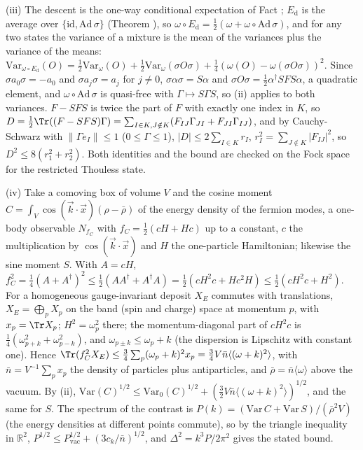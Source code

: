 (iii) The descent is the one-way conditional expectation of Fact ; $E_{\mathrm{d}}$ is the average over $\{\mathrm{id}, \mathrm{Ad}\,\sigma\}$ (Theorem ), so $\omega\circ E_{\mathrm{d}} = \tfrac12(\omega + \omega\circ\mathrm{Ad}\,\sigma)$, and for any two states the variance of a mixture is the mean of the variances plus the variance of the means: $\mathrm{Var}_{\omega\circ E_{\mathrm{d}}}(O) = \tfrac12\mathrm{Var}_{\omega}(O) + \tfrac12\mathrm{Var}_{\omega}(\sigma O\sigma) + \tfrac14(\omega(O) - \omega(\sigma O\sigma))^{2}$. Since $\sigma a_{0}\sigma = -a_{0}$ and $\sigma a_{j}\sigma = a_{j}$ for $j \ne 0$, $\sigma\alpha\sigma = S\alpha$ and $\sigma O\sigma = \tfrac12\alpha^{\dagger}SFS\alpha$, a quadratic element, and $\omega\circ\mathrm{Ad}\,\sigma$ is quasi-free with $\Gamma \mapsto S\Gamma S$, so (ii) applies to both variances. $F - SFS$ is twice the part of $F$ with exactly one index in $K$, so $D = \tfrac12\Tr((F - SFS)\Gamma) = \sum_{I \in K, J \notin K}(F_{IJ}\Gamma_{JI} + F_{JI}\Gamma_{IJ})$, and by Cauchy-Schwarz with $\|\Gamma e_{I}\| \le 1$ ($0 \le \Gamma \le 1$), $|D| \le 2\sum_{I \in K}r_{I}$, $r_{I}^{2} = \sum_{J \notin K}|F_{IJ}|^{2}$, so $D^{2} \le 8(r_{1}^{2} + r_{2}^{2})$. Both identities and the bound are checked on the Fock space for the restricted Thouless state.

(iv) Take a comoving box of volume $V$ and the cosine moment $C = \int_{V}\cos(\vec k\cdot\vec x)(\rho - \bar\rho)$ of the energy density of the fermion modes, a one-body observable $N_{f_{C}}$ with $f_{C} = \tfrac12(cH + Hc)$ up to a constant, $c$ the multiplication by $\cos(\vec k\cdot\vec x)$ and $H$ the one-particle Hamiltonian; likewise the sine moment $S$. With $A = cH$, $f_{C}^{2} = \tfrac14(A + A^{\dagger})^{2} \le \tfrac12(AA^{\dagger} + A^{\dagger}A) = \tfrac12(cH^{2}c + Hc^{2}H) \le \tfrac12(cH^{2}c + H^{2})$. For a homogeneous gauge-invariant deposit $X_{E}$ commutes with translations, $X_{E} = \bigoplus_{p}X_{p}$ on the band (spin and charge) space at momentum $p$, with $x_{p} = \Tr X_{p}$; $H^{2} = \omega_{p}^{2}$ there; the momentum-diagonal part of $cH^{2}c$ is $\tfrac14(\omega_{p + k}^{2} + \omega_{p - k}^{2})$, and $\omega_{p \pm k} \le \omega_{p} + k$ (the dispersion is Lipschitz with constant one). Hence $\Tr(f_{C}^{2}X_{E}) \le \tfrac34\sum_{p}(\omega_{p} + k)^{2}x_{p} = \tfrac34 V\bar n\langle(\omega + k)^{2}\rangle$, with $\bar n = V^{-1}\sum_{p}x_{p}$ the density of particles plus antiparticles, and $\bar\rho = \bar n\langle\omega\rangle$ above the vacuum. By (ii), $\mathrm{Var}(C)^{1/2} \le \mathrm{Var}_{0}(C)^{1/2} + (\tfrac32 V\bar n\langle(\omega + k)^{2}\rangle)^{1/2}$, and the same for $S$. The spectrum of the contrast is $P(k) = (\mathrm{Var}\,C + \mathrm{Var}\,S)/(\bar\rho^{2}V)$ (the energy densities at different points commute), so by the triangle inequality in $\mathbb{R}^{2}$, $P^{1/2} \le P_{\mathrm{vac}}^{1/2} + (3c_{k}/\bar n)^{1/2}$, and $\Delta^{2} = k^{3}P/2\pi^{2}$ gives the stated bound.


